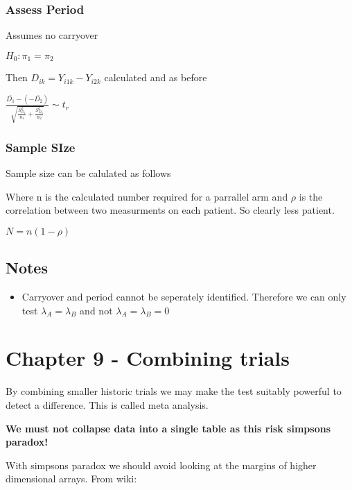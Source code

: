 \documentclass[
  letterpaper,
  DIV=11,
  numbers=noendperiod]{scrreprt}
\providecommand{\tightlist}{%
  \setlength{\itemsep}{0pt}\setlength{\parskip}{0pt}}\usepackage{longtable,booktabs,array}
\begin{document}
\hypertarget{assess-period}{%
\subsubsection{Assess Period}\label{assess-period}}

Assumes no carryover

\(H_0 : \pi_1 = \pi_2\)

Then \(D_{ik} = Y_{i1k} - Y_{i2k}\) calculated and as before

\(\frac{\bar{D_1} - (-\bar{D_2})} {\sqrt{  \frac{S^2_{D_1}}{n_1} +  \frac{S^2_{D_2}}{n_2} }} \sim t_r\)

\hypertarget{sample-size}{%
\subsubsection{Sample SIze}\label{sample-size}}

Sample size can be calulated as follows

Where n is the calculated number required for a parrallel arm and
\(\rho\) is the correlation between two measurments on each patient. So
clearly less patient.

\(N = n(1-\rho)\)

\hypertarget{notes}{%
\subsection{Notes}\label{notes}}

\begin{itemize}
\tightlist
\item
  Carryover and period cannot be seperately identified. Therefore we can
  only test \(\lambda_A = \lambda_B\) and not
  \(\lambda_A = \lambda_B = 0\)
\end{itemize}

\hypertarget{chapter-9---combining-trials}{%
\section{Chapter 9 - Combining
trials}\label{chapter-9---combining-trials}}

By combining smaller historic trials we may make the test suitably
powerful to detect a difference. This is called meta analysis.

\textbf{We must not collapse data into a single table as this risk
simpsons paradox!}

With simpsons paradox we should avoid looking at the margins of higher
dimensional arrays. From wiki:
\end{document}
